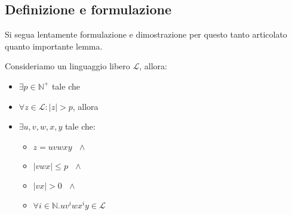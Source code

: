 \documentclass[class=book, crop=false, oneside, 12pt]{standalone}
\begin{document}
\subsection{Definizione e formulazione}
Si segua lentamente formulazione e dimostrazione per questo tanto articolato quanto importante lemma.
\begin{lemma}
  Consideriamo un linguaggio libero \(\mathcal{L}\), allora:
  \begin{itemize}
    \item \(\exists p \in \mathbb{N}^+\) tale che
    \item \(\forall z \in \mathcal{L} : |z| > p\), allora
    \item \(\exists u, v, w, x, y\) tale che:
    \begin{itemize}
      \item \(z = uvwxy \textrm{ } \land\)
      \item \(|vwx| \leq p \textrm{ } \land\)
      \item \(|vx| > 0 \textrm{ }\land\)
      \item \(\forall i \in \mathbb{N}.uv^iwx^iy \in \mathcal{L}\)
    \end{itemize}
  \end{itemize}
\end{lemma}
\end{document}
